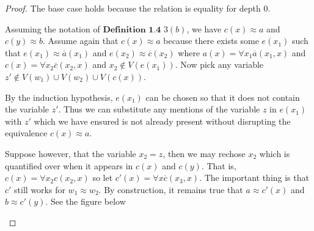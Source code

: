 \documentclass{article}
\theoremstyle{problemstyle}
\theoremstyle{lemmastyle}
\theoremstyle{theoremstyle}
\begin{document}
\begin{proof}
The base case holds because the relation is equality for depth $0$. 

Assuming the notation of $\textbf{Definition 1.4}$ $3 (b)$, we have $c(x) \approx a$ and $c(y) \approx b$.  Assume again that $c(x) \approx a$ because there exists some $e(x_1)$ such that $e(x_1) \approx \overline{a}(x_1)$ and $e(x_2) \approx \overline{c}(x_2)$ where $a(x) = \forall x_1 \overline{a}(x_1,x)$ and $c(x) = \forall x_2 \overline{c}(x_2,x)$ and $x_2 \notin V(e(x_1))$. Now pick any variable $z' \notin V(w_1) \cup V(w_2)\cup V(c(x))$. 

By the induction hypothesis, $e(x_1)$ can be chosen so that it does not contain the variable $z'$. Thus we can substitute any mentions of the variable $z$ in $e(x_1)$ with $z'$ which we have ensured is not already present without disrupting the equivalence $c(x) \approx a$.  

Suppose however, that the variable $x_2 = z$, then we may rechose $x_2$ which is quantified over when it appears in $c(x)$ and $c(y)$. That is, $c(x) = \forall x_2c(x_2,x)$ so let $c'(x) = \forall x\overline{c}(x_3,x)$. The important thing is that $c'$ still works for $w_1 \approx w_2$. By construction, it remains true that $a \approx c'(x)$ and $b \approx c'(y)$. See the figure below

\begin{center}
\end{center}
\end{proof}
\end{document}
